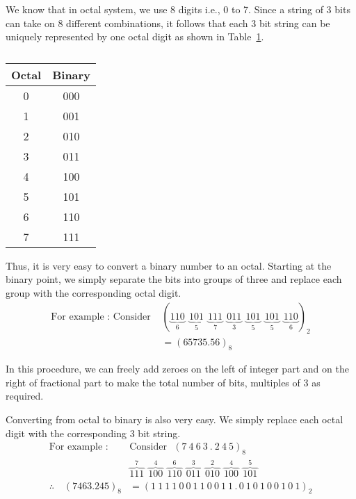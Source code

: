 \smallskip
{}

We know that in octal system, we use 8 digits i.e., 0 to 7. Since a string of 3 bits can take on 8 different combinations, it follows that each 3 bit string can be uniquely represented by one octal digit as shown in Table~\ref{tab7.1}.
\begin{table}[H]
\centering
\caption{}\label{tab7.1}
\renewcommand{\arraystretch}{1.2}
\tabcolsep=15pt
\begin{tabular}{|c|c|}
\hline
{\bf Octal} & {\bf Binary}\\[3pt]
\hline
0 & 000\\
1 & 001\\
2 & 010\\
3 & 011\\
4 & 100\\
5 & 101\\
6 & 110\\
7 & 111\\
\hline
\end{tabular}
\end{table}

Thus, it is very easy to convert a binary number to an octal. Starting at the binary point, we simply separate the bits into groups of three and replace each group with the corresponding octal digit.
\begin{align*}
\text{For example~: Consider~} & (\underbrace{110}_{6} \ \ \underbrace{101}_{5} \ \ \underbrace{111}_{7} \ \ \underbrace{011}_{3} \ \ \underbrace{101}_{5} \ \ \underbrace{101}_{5} \ \ \underbrace{110}_{6})_{2}\\[4pt]
&= (65735.56)_{8}
\end{align*}

In this procedure, we can freely add zeroes on the left of integer part and on the right of fractional part to make the total number of bits, multiples of 3 as required.

\medskip
{}

Converting from octal to binary is also very easy. We simply replace each octal digit with the corresponding 3 bit string.
\begin{align*}
\text{For example~:~} & \text{Consider~ } (7~4~6~3~.~2~4~5)_{8}\\[3pt]
                      & \overbrace{111}^{7} \ \ \overbrace{100}^{4} \ \ \overbrace{110}^{6} \ \ \overbrace{011}^{3} \ \ \overbrace{010}^{2} \ \ \overbrace{100}^{4} \ \ \overbrace{101}^{5}\\[3pt]
\therefore\quad (7463.245)_{8} &= (1~1~1~1~0~0~1~1~0~0~1~1\,.\,0~1~0~1~0~0~1~0~1)_{2}
\end{align*}


